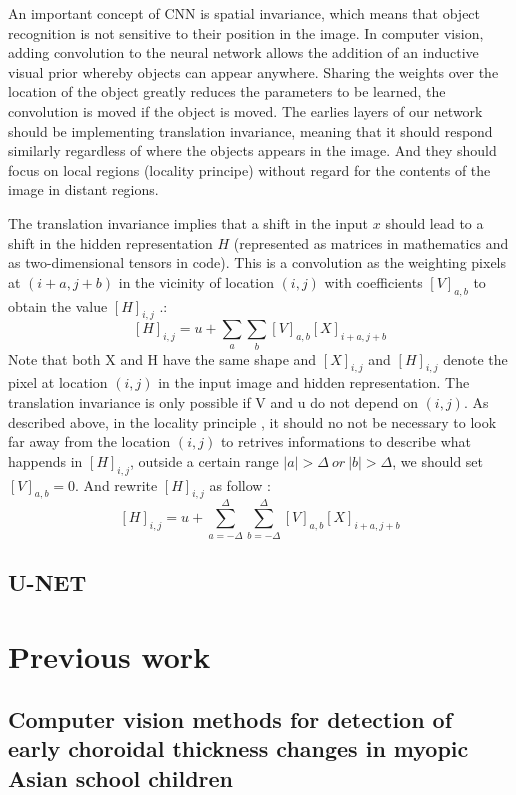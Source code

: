 \documentclass[12pt,a4paper]{scrartcl}
\begin{document}
An important concept of CNN is spatial invariance, which means that object recognition is not sensitive to their position in the image. In computer vision, adding convolution to the neural network allows the addition of an inductive visual prior whereby objects can appear anywhere.  Sharing the weights over the location of the object greatly reduces the parameters to be learned, the convolution is moved if the object is moved.\cite{CNNSpatialLocation} The earlies layers of our network should be implementing translation invariance, meaning that it should respond similarly  regardless of where the objects appears in the image. And they should focus on local regions (locality principe) without regard for the contents of the image in distant regions. \cite{DIDLBook}

The translation invariance implies that a shift in the input \(x\) should lead to a shift in the hidden representation \(H\) (represented as matrices in mathematics and as two-dimensional tensors in code). 
This is a convolution as the weighting pixels at \((i + a, j + b)\) in the vicinity of location
\((i, j)\) with coefficients \([V]_{a,b}\) to obtain the value \([H]_{i,j}\) .: 
\[[H]_{i,j} = u + \sum_a\sum_b[V]_{a,b}[X]_{i+a,j+b}\]
Note that both X and H have the same shape and \([X]_{i,j}\) and \([H]_{i,j}\) denote the pixel at location \((i, j)\) in the input image and hidden representation. The translation invariance is only possible if V and u do not depend on \((i, j)\). \cite{DIDLBook}
As described above, in the locality principle , it should no not be necessary to look far away from the location \((i, j)\) to retrives informations to describe what happends in \([H]_{i,j}\), outside a certain range \(|a| > \Delta \: or \: |b| > \Delta\), we should set  \([V]_{a,b} = 0\). And rewrite \([H]_{i,j}\) as follow \cite{DIDLBook}:
\[[H]_{i,j} = u + \sum_{a=-\Delta}^{\Delta}\sum_{b=-\Delta}^{\Delta}[V]_{a,b}[X]_{i+a,j+b}\]



\subsection{U-NET}


\section{Previous work}\label{prevWork}
\subsection{Computer vision methods for detection of early choroidal thickness changes in myopic Asian school children}
\end{document}
